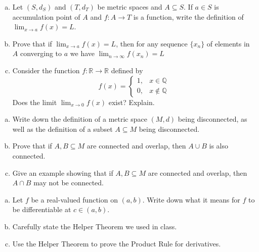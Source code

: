 \documentclass[11pt]{exam}
\theoremstyle{definition}
\begin{document}
\begin{questions}
\begin{enumerate}[(a)]
\item  Let $(S,d_S)$ and $(T,d_T)$ be metric spaces and $A\subseteq S$.  If $a\in S$ is accumulation point of $A$ and $f: A\rightarrow T$ is a function, write the definition of $\lim_{x\rightarrow a} f(x) = L$.
\vspace{1in}
\item  Prove that if  $\lim_{x\rightarrow a} f(x) = L$, then for any sequence $\{x_n\}$ of elements in $A$ converging to $a$ we have $\lim_{n\rightarrow\infty} f(x_n)=L$
\vspace{3in}
\item  Consider the function $f:\mathbb{R}\rightarrow\mathbb{R}$ defined by
$$f(x) = \left\lbrace\begin{array}{cc}
1, & x\in\mathbb{Q}\\
0, & x\notin\mathbb{Q}
\end{array}\right.$$
Does the limit $\lim_{x\rightarrow 0} f(x)$ exist?  Explain.
\end{enumerate}

\newpage
\question[10]\mbox{}
\begin{enumerate}[(a)]
\item Write down the definition of a metric space $(M,d)$ being disconnected, as well as the definition of a subset $A\subseteq M$ being disconnected.
\vspace{1in}
\item Prove that if $A,B\subseteq M$ are connected and overlap, then $A\cup B$ is also connected.
\vspace{3in}
\item Give an example showing that if $A,B\subseteq M$ are connected and overlap, then $A\cap B$ may not be connected.
\end{enumerate}

\newpage

\newpage
\question[10]\mbox{}
\begin{enumerate}[(a)]
\item Let $f$ be a real-valued function on $(a,b)$.  Write down what it means for $f$ to be differentiable at $c\in (a,b)$.
\vspace{2in}
\item Carefully state the Helper Theorem we used in class.
\vspace{2in}
\item Use the Helper Theorem to prove the Product Rule for derivatives.
\end{enumerate}


\end{questions}
\end{document}
